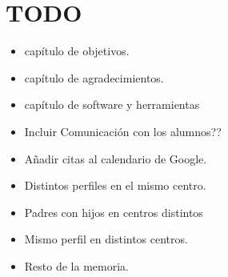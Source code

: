 %
%
%
%

\cleardoublepage
\chapter{TODO}
\label{chap:TODO}

\begin{itemize}
	\item capítulo de objetivos.
	\item capítulo de agradecimientos.
	\item capítulo de software y herramientas
	\item Incluir Comunicaci\'on con los alumnos??
	\item Añadir citas al calendario de Google.
	\item Distintos perfiles en el mismo centro.
	\item Padres con hijos en centros distintos
	\item Mismo perfil en distintos centros.
	\item Resto de la memoria.
\end{itemize}